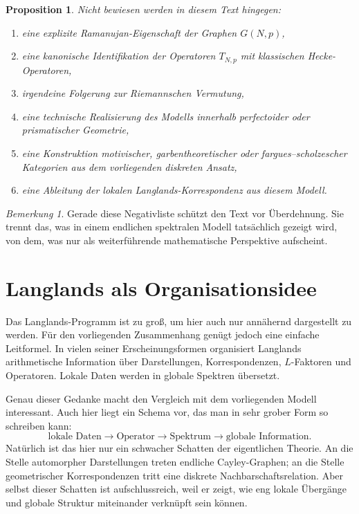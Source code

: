 \documentclass[12pt,a4paper]{article}
\theoremstyle{plain}
\newtheorem{proposition}[satz]{Proposition}
\theoremstyle{definition}
\theoremstyle{remark}
\newtheorem{bemerkung}[satz]{Bemerkung}
\newcommand{\GNp}{G(N,p)}
\newcommand{\TNp}{T_{N,p}}
\begin{document}
\begin{proposition}
Nicht bewiesen werden in diesem Text hingegen:
\begin{enumerate}[label=\arabic*.]
\item eine explizite Ramanujan-Eigenschaft der Graphen \(\GNp\),
\item eine kanonische Identifikation der Operatoren \(\TNp\) mit klassischen Hecke-Operatoren,
\item irgendeine Folgerung zur Riemannschen Vermutung,
\item eine technische Realisierung des Modells innerhalb perfectoider oder prismatischer Geometrie,
\item eine Konstruktion motivischer, garbentheoretischer oder fargues--scholzescher Kategorien aus dem vorliegenden diskreten Ansatz,
\item eine Ableitung der lokalen Langlands-Korrespondenz aus diesem Modell.
\end{enumerate}
\end{proposition}

\begin{bemerkung}
Gerade diese Negativliste schützt den Text vor Überdehnung. Sie trennt das, was in einem endlichen spektralen Modell tatsächlich gezeigt wird, von dem, was nur als weiterführende mathematische Perspektive aufscheint.
\end{bemerkung}

\section{Langlands als Organisationsidee}
Das Langlands-Programm ist zu groß, um hier auch nur annähernd dargestellt zu werden. Für den vorliegenden Zusammenhang genügt jedoch eine einfache Leitformel. In vielen seiner Erscheinungsformen organisiert Langlands arithmetische Information über Darstellungen, Korrespondenzen, \(L\)-Faktoren und Operatoren. Lokale Daten werden in globale Spektren übersetzt.

Genau dieser Gedanke macht den Vergleich mit dem vorliegenden Modell interessant. Auch hier liegt ein Schema vor, das man in sehr grober Form so schreiben kann:
\[
\text{lokale Daten} \longrightarrow \text{Operator} \longrightarrow \text{Spektrum} \longrightarrow \text{globale Information}.
\]
Natürlich ist das hier nur ein schwacher Schatten der eigentlichen Theorie. An die Stelle automorpher Darstellungen treten endliche Cayley-Graphen; an die Stelle geometrischer Korrespondenzen tritt eine diskrete Nachbarschaftsrelation. Aber selbst dieser Schatten ist aufschlussreich, weil er zeigt, wie eng lokale Übergänge und globale Struktur miteinander verknüpft sein können.
\end{document}
